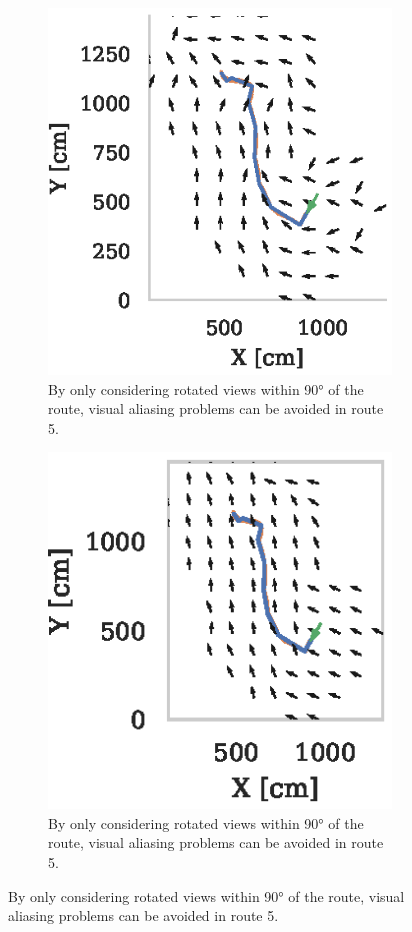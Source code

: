 \documentclass[letterpaper]{article}
\begin{document}
\begin{figure}[t]
\begin{subfigure}[t]{0.24\textwidth}
        \label{fig:vector_fields/route5_perfect_memory_mask}
    \end{subfigure}
    \begin{subfigure}[t]{0.24\textwidth}
        \includegraphics{figures/vector_field_route5_PerfectMemoryConstrained_mask.eps}
        \caption{By only considering rotated views within 90° of the route, visual aliasing problems can be avoided in route 5.}
        \label{fig:vector_fields/route5_perfect_memory_constrained_mask}
    \end{subfigure}
    \begin{subfigure}[t]{0.24\textwidth}
        \includegraphics{figures/vector_field_route5_InfoMaxConstrained_mask.eps}
        \caption{By only considering rotated views within 90° of the route, visual aliasing problems can be avoided in route 5.}
        \label{fig:vector_fields/route5_infomax_constrained_mask}
    \end{subfigure}
    

\end{figure}
\end{document}
